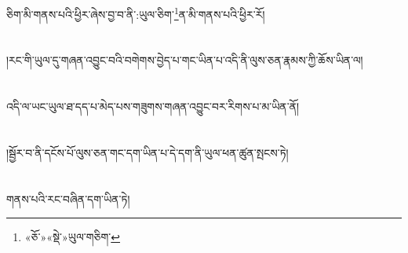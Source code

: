 ཅིག་མི་གནས་པའི་ཕྱིར་ཞེས་བྱ་བ་ནི་:ཡུལ་ཅིག་\footnote{«ཅོ་»«སྡེ་»ཡུལ་གཅིག་}ན་མི་གནས་པའི་ཕྱིར་རོ།\chapter{ }།རང་གི་ཡུལ་དུ་གཞན་འབྱུང་བའི་བགེགས་བྱེད་པ་གང་ཡིན་པ་འདི་ནི་ལུས་ཅན་རྣམས་ཀྱི་ཆོས་ཡིན་ལ།\chapter{ }འདི་ལ་ཡང་ཡུལ་ཐ་དད་པ་མེད་པས་གཟུགས་གཞན་འབྱུང་བར་རིགས་པ་མ་ཡིན་ནོ།\chapter{ }།སྦྱོར་བ་ནི་དངོས་པོ་ལུས་ཅན་གང་དག་ཡིན་པ་དེ་དག་ནི་ཡུལ་ཕན་ཚུན་སྤངས་ཏེ།\chapter{ }གནས་པའི་རང་བཞིན་དག་ཡིན་ཏེ།\
